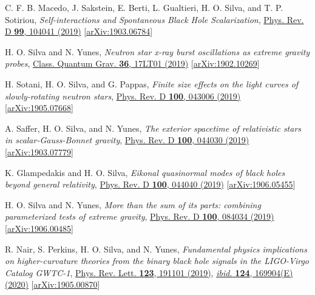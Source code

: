 \documentclass[10pt]{article}
\begin{document}
\begin{bibenum}
    \item C. F. B. Macedo, J. Sakstein, E. Berti, L. Gualtieri, H. O. Silva, and T. P. Sotiriou,
    \emph{Self-interactions and Spontaneous Black Hole Scalarization},
    \href{https://journals.aps.org/prd/abstract/10.1103/PhysRevD.99.104041}{Phys. Rev. D {\bf 99}, 104041 (2019)}
    [\href{https://arxiv.org/abs/1903.06784}{arXiv:1903.06784}]

    \item H. O. Silva and N. Yunes,
    \emph{Neutron star x-ray burst oscillations as extreme gravity probes},
    \href{https://iopscience.iop.org/article/10.1088/1361-6382/ab3560}{Class. Quantum Grav. {\bf 36}, 17LT01 (2019)}
    [\href{https://arxiv.org/abs/1902.10269}{arXiv:1902.10269}]

    \item H. Sotani, H. O. Silva, and G. Pappas,
    \emph{Finite size effects on the light curves of slowly-rotating neutron stars},
    \href{https://journals.aps.org/prd/abstract/10.1103/PhysRevD.100.043006}{Phys. Rev. D {\bf 100}, 043006 (2019)}
    [\href{https://arxiv.org/abs/1905.07668}{arXiv:1905.07668}]
    \label{itm:pp_fs}

    \item A. Saffer, H. O. Silva, and N. Yunes,
    \emph{The exterior spacetime of relativistic stars in scalar-Gauss-Bonnet gravity},
    \href{https://journals.aps.org/prd/abstract/10.1103/PhysRevD.100.044030}{Phys. Rev. D {\bf 100}, 044030 (2019)}
    [\href{https://arxiv.org/abs/1903.07779}{arXiv:1903.07779}]

    \item K. Glampedakis and H. O. Silva,
    \emph{Eikonal quasinormal modes of black holes beyond general relativity},
    \href{https://journals.aps.org/prd/abstract/10.1103/PhysRevD.100.044040}{Phys. Rev. D {\bf 100}, 044040 (2019)}
    [\href{https://arxiv.org/abs/1906.05455}{arXiv:1906.05455}]

    \item H. O. Silva and N. Yunes,
    \emph{More than the sum of its parts: combining parameterized tests of extreme gravity},
    \href{https://link.aps.org/doi/10.1103/PhysRevD.100.084034}{Phys. Rev. D {\bf 100}, 084034 (2019)}
    [\href{https://arxiv.org/abs/1906.00485}{arXiv:1906.00485}]

    \item R. Nair, S. Perkins, H. O. Silva, and N. Yunes,
    \emph{Fundamental physics implications on higher-curvature theories from
          the binary black hole signals in the LIGO-Virgo Catalog GWTC-1},
    \href{https://link.aps.org/doi/10.1103/PhysRevLett.123.191101}{Phys. Rev. Lett. {\bf 123}, 191101 (2019)},
    \href{https://journals.aps.org/prl/abstract/10.1103/PhysRevLett.124.169904}{\emph{ibid.} {\bf 124}, 169904(E) (2020)}
    [\href{https://arxiv.org/abs/1905.00870}{arXiv:1905.00870}]
    \label{pub:nairPRL2020}


\end{bibenum}
\end{document}
